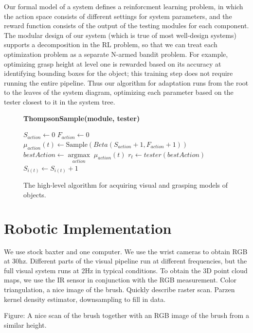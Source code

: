 \documentclass{article}
\newcommand{\argmax}[1]{\underset{#1}{\operatorname{argmax}}\;}
\begin{document}
Our formal model of a system defines a reinforcment learning problem,
in which the action space consists of different settings for system
parameters, and the reward function consists of the output of the
testing modules for each component.  The modular design of our system
(which is true of most well-design systems) supports a decomposition
in the RL problem, so that we can treat each optimization problem as a
separate N-armed bandit problem.  For example, optimizing grasp height
at level one is rewarded based on its accuracy at identifying bounding
boxes for the object; this training step does not require running the
entire pipeline.  Thus our algorithm for adaptation runs from the root
to the leaves of the system diagram, optimizing each parameter based
on the tester closest to it in the system tree.
\begin{figure}
  \textbf{ThompsonSample(module, tester)}
  \begin{algorithmic}
    \STATE $S_{action} \gets 0$
    \STATE $F_{action} \gets 0$
    \ENDFOR
      \STATE $\mu_{action}(t) \gets \mbox{Sample}(Beta(S_{action} + 1, F_{action} + 1))$
      \ENDFOR
      \STATE $bestAction \gets \argmax{action} \mu_{action}(t)$
      \STATE $r_t \gets tester(bestAction)$
       \STATE $S_{i(t)} \gets S_{i(t)} + 1$
      \ENDIF
    \ENDFOR
  \end{algorithmic}
  \caption{The high-level algorithm for acquiring visual and grasping
    models of objects.}
\end{figure}

\section{Robotic Implementation}
We use stock baxter and one computer.
We use the wrist cameras to obtain RGB at 30hz. Different parts of the visual pipeline
run at different frequencies, but the full visual system runs at 2Hz in typical conditions.
To obtain the 3D point cloud maps, we use the IR sensor in conjunction with the RGB measurement.
Color triangulation, a nice image of the brush.
Quickly describe raster scan.
Parzen kernel density estimator, downsampling to fill in data.

Figure: A nice scan of the brush together with an RGB image of the brush from a similar height.
\end{document}
